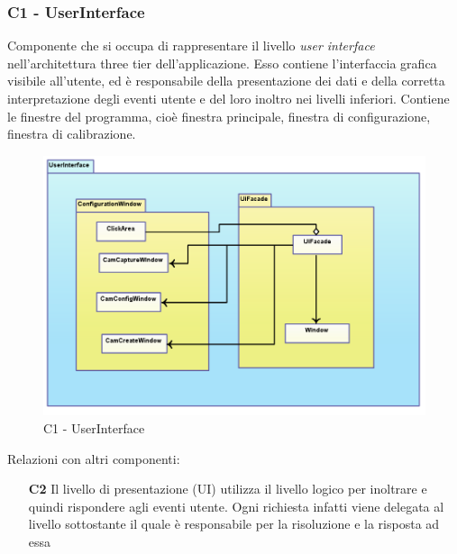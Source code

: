 \subsubsection{C1 - UserInterface} \label{sec:c1}
Componente che si occupa di rappresentare il livello \textit{user interface} nell'architettura three tier dell'applicazione. Esso contiene l'interfaccia grafica visibile all'utente, ed è responsabile della presentazione dei dati e della corretta interpretazione degli eventi utente e del loro inoltro nei livelli inferiori. Contiene le finestre del programma, cioè finestra principale, finestra di configurazione, finestra di calibrazione. \\
\begin{figure}[!h] 

        \centering 

        \includegraphics[scale=0.4]{./images/c1.png} 

        \caption{C1 - UserInterface} 

        \label{fig:c1}

        \end{figure} 

Relazioni con altri componenti: 
\begin{itemize} 
\item [\textbf{C2}]
Il livello di presentazione (UI) utilizza il livello logico per inoltrare e quindi rispondere agli eventi utente. Ogni richiesta infatti viene delegata al livello sottostante il quale è responsabile per la risoluzione e la risposta ad essa 
\end{itemize} 

